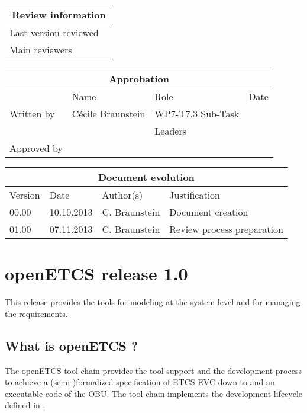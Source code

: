 \documentclass{openetcs_report}
\begin{document}
\begin{tabular}{|p{4.4cm}|p{8.7cm}|}
\hline
\multicolumn{2}{|c|}{Review information} \\
\hline
Last version reviewed &  \\
\hline
Main reviewers & \\
\hline
\end{tabular}

\begin{tabular}{|p{2.2cm}|p{4cm}|p{4cm}|p{2cm}|}
\hline
\multicolumn{4}{|c|}{Approbation} \\
\hline
  &  Name & Role & Date   \\
\hline  
Written by    &  Cécile Braunstein & WP7-T7.3 Sub-Task  & \\
&  & Leaders&\\
\hline
Approved by & &  & \\
\hline
\end{tabular}

\begin{tabular}{|p{2.2cm}|p{2cm}|p{3cm}|p{5cm}|}
\hline
\multicolumn{4}{|c|}{Document evolution} \\
\hline
Version &  Date & Author(s) & Justification  \\
\hline  
00.00 & 10.10.2013 & C. Braunstein  &  Document creation  \\
01.00 & 07.11.2013 & C. Braunstein  &  Review process preparation \\

\hline  
\end{tabular}
\newpage


\mainmatter
\chapter{openETCS release 1.0}

This release provides the tools for modeling at the system level and
for managing the requirements.

\section{What is openETCS ?}
The openETCS tool chain provides the tool support and the development process to achieve a (semi-)formalized
specification of ETCS EVC down to and an executable code of the
OBU. The tool chain implements the development lifecycle defined in \cite{D2.3}.
\end{document}
